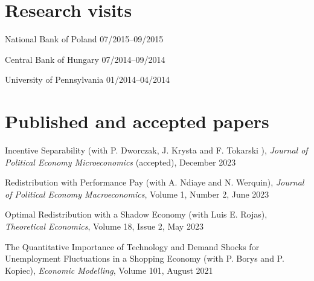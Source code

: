 \documentclass[letterpaper]{article}
\renewenvironment{itemize}{
  \begin{list}{}{
    \setlength{\leftmargin}{1.5em}
  }
}{
  \end{list}
}
\begin{document}
\section*{Research visits}

\begin{itemize}
  \item National Bank of Poland \hfill  07/2015--09/2015
  \item Central Bank of Hungary \hfill  07/2014--09/2014
  \item University of Pennsylvania \hfill  01/2014--04/2014
\end{itemize}


  



\section*{Published and accepted papers}

\begin{itemize}
\item Incentive Separability (with P. Dworczak, J. Krysta and F. Tokarski ), \textit{Journal of Political Economy Microeconomics} (accepted), December 2023
\item Redistribution with Performance Pay (with A. Ndiaye and N. Werquin), \textit{Journal of Political Economy Macroeconomics}, Volume 1, Number 2, June 2023
\item Optimal Redistribution with a Shadow Economy (with Luis E. Rojas), \textit{Theoretical Economics}, Volume 18, Issue 2, May 2023
\item The Quantitative Importance of Technology and Demand Shocks for Unemployment Fluctuations in a Shopping Economy (with P. Borys and P. Kopiec), \textit{Economic Modelling}, Volume 101, August 2021
\end{itemize}
\end{document}
